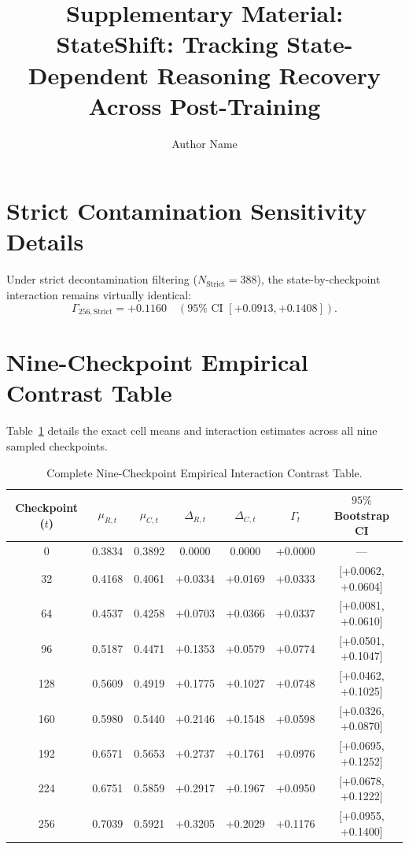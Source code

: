 \documentclass[11pt,3p,review]{elsarticle}
\begin{document}
\begin{frontmatter}
\title{Supplementary Material: StateShift: Tracking State-Dependent Reasoning Recovery Across Post-Training}
\author{Author Name}
\address{Department Name, Institution Name, City, Country}
\end{frontmatter}

\section{Strict Contamination Sensitivity Details}
Under strict decontamination filtering ($N_{\text{Strict}} = 388$), the state-by-checkpoint interaction remains virtually identical:
\begin{equation}
\Gamma_{256,\text{Strict}} = +0.1160 \quad (95\% \text{ CI } [+0.0913, +0.1408]).
\end{equation}

\section{Nine-Checkpoint Empirical Contrast Table}
Table~\ref{tab:supp_trajectory} details the exact cell means and interaction estimates across all nine sampled checkpoints.

\begin{table}[h]
\centering
\caption{Complete Nine-Checkpoint Empirical Interaction Contrast Table.}
\label{tab:supp_trajectory}
\begin{tabular}{ccccccc}
\toprule
Checkpoint ($t$) & $\mu_{R,t}$ & $\mu_{C,t}$ & $\Delta_{R,t}$ & $\Delta_{C,t}$ & $\Gamma_t$ & $95\%$ Bootstrap CI \\
\midrule
0   & 0.3834 & 0.3892 & 0.0000 & 0.0000 & +0.0000 & --- \\
32  & 0.4168 & 0.4061 & +0.0334 & +0.0169 & +0.0333 & [+0.0062, +0.0604] \\
64  & 0.4537 & 0.4258 & +0.0703 & +0.0366 & +0.0337 & [+0.0081, +0.0610] \\
96  & 0.5187 & 0.4471 & +0.1353 & +0.0579 & +0.0774 & [+0.0501, +0.1047] \\
128 & 0.5609 & 0.4919 & +0.1775 & +0.1027 & +0.0748 & [+0.0462, +0.1025] \\
160 & 0.5980 & 0.5440 & +0.2146 & +0.1548 & +0.0598 & [+0.0326, +0.0870] \\
192 & 0.6571 & 0.5653 & +0.2737 & +0.1761 & +0.0976 & [+0.0695, +0.1252] \\
224 & 0.6751 & 0.5859 & +0.2917 & +0.1967 & +0.0950 & [+0.0678, +0.1222] \\
256 & 0.7039 & 0.5921 & +0.3205 & +0.2029 & +0.1176 & [+0.0955, +0.1400] \\
\bottomrule
\end{tabular}
\end{table}
\end{document}

